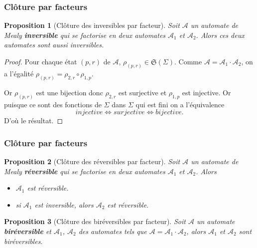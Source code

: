 \documentclass[11pt]{beamer}
\newtheorem{prop}{Proposition}
\begin{document}
\begin{frame}
  \frametitle{Clôture par facteurs}
  \begin{prop}[Clôture des inversibles par facteur]
    Soit $\mathcal{A}$ un automate de Mealy \textbf{inversible} qui se factorise en deux automates $\mathcal{A}_1$ et $\mathcal{A}_2$. Alors ces deux automates sont aussi inversibles.
  \end{prop}

  \begin{proof}
    Pour chaque état $(p, r)$ de $\mathcal{A}$, $\rho_{(p, r)}\in \mathfrak{S}(\Sigma)$. Comme $\mathcal{A}=\mathcal{A}_1\cdot\mathcal{A}_2$, on a l'égalité $\rho_{(p, r)}=\rho_{2,r}\circ\rho_{1,p}$.

    Or $\rho_{(p, r)}$ est une bijection donc $\rho_{2,r}$ est surjective et ${\rho_{1,p}}$ est injective. Or puisque ce sont des fonctions de $\Sigma$ dans $\Sigma$ qui est fini on a l'équivalence
    \[ injective \iff surjective \iff bijective. \]
    D'où le résultat.
  \end{proof}

\end{frame}

\begin{frame}
  \frametitle{Clôture par facteurs}
  \begin{prop}[Clôture des réversibles par facteur]
    Soit $\mathcal{A}$ un automate de Mealy \textbf{réversible} qui se factorise en deux automates $\mathcal{A}_1$ et $\mathcal{A}_2$. Alors
    \begin{itemize}
    \item $\mathcal{A}_1$ est réversible.
    \item si $\mathcal{A}_1$ est inversible, alors $\mathcal{A}_2$ est réversible.
    \end{itemize}
  \end{prop}

  \begin{prop}[Clôture des biréversibles par facteur]
    Soit $\mathcal{A}$ un automate \textbf{biréversible} et $\mathcal{A}_1$, $\mathcal{A}_2$ des automates tels que $\mathcal{A}=\mathcal{A}_1\cdot\mathcal{A}_2$, alors $\mathcal{A}_1$ et $\mathcal{A}_2$ sont biréversibles.
  \end{prop}

\end{frame}
\end{document}

